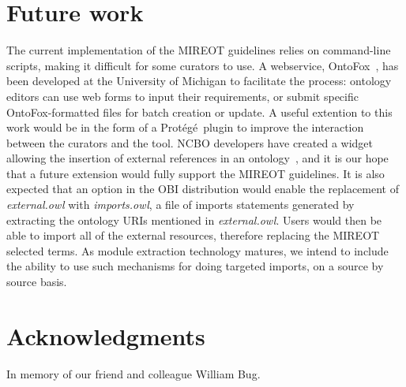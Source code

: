 \documentclass{ao2e}%
\newcommand{\protege}{Prot\'{e}g\'{e}}
\begin{document}
\section*{Future work}
The current implementation of the \ac{MIREOT} guidelines relies on command-line scripts, making it difficult for some curators to use. 
A webservice, OntoFox~\cite{OntoFox}, has been developed at the University of Michigan to facilitate the process: ontology editors can use web forms to input their requirements, or submit specific OntoFox-formatted files for batch creation or update.
A useful extention to this work would be in the form of a \protege\  plugin to improve the interaction between the curators and the tool. NCBO developers have created a widget allowing the insertion of external references in an ontology~\cite{NCBOWidget}, and it is our hope that a future extension would fully support the MIREOT guidelines.
It is also expected that an option in the OBI distribution would enable the replacement of \emph{external.owl} with \emph{imports.owl}, a file of imports statements generated by extracting the ontology URIs mentioned in \emph{external.owl}. Users would then be able to import all of the external resources, therefore replacing the MIREOT selected terms.  As module extraction technology matures, we intend to include the ability to use such mechanisms for doing targeted imports, on a source by source basis.%



\section*{Acknowledgments}

In memory of our friend and colleague William Bug. 
\end{document}
